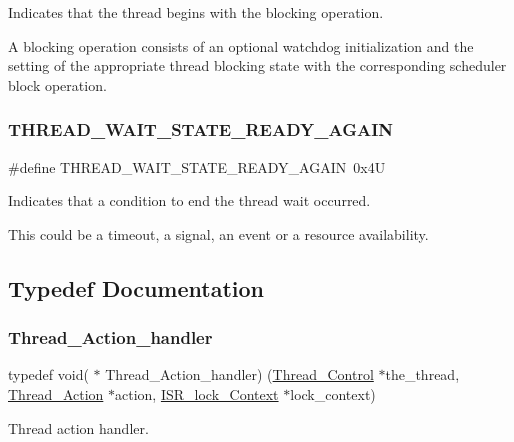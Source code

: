 Indicates that the thread begins with the blocking operation. 

A blocking operation consists of an optional watchdog initialization and the setting of the appropriate thread blocking state with the corresponding scheduler block operation. \mbox{\label{group__RTEMSScoreThread_gac00cb9ccdda63a4731f4d80a89371ea0}} 
\subsubsection{\texorpdfstring{THREAD\_WAIT\_STATE\_READY\_AGAIN}{THREAD\_WAIT\_STATE\_READY\_AGAIN}}
{\footnotesize\ttfamily \#define T\+H\+R\+E\+A\+D\+\_\+\+W\+A\+I\+T\+\_\+\+S\+T\+A\+T\+E\+\_\+\+R\+E\+A\+D\+Y\+\_\+\+A\+G\+A\+IN~0x4U}



Indicates that a condition to end the thread wait occurred. 

This could be a timeout, a signal, an event or a resource availability. 

\subsection{Typedef Documentation}
\mbox{\label{group__RTEMSScoreThread_ga3ed91c6271fd8090120d824662541c74}} 
\subsubsection{\texorpdfstring{Thread\_Action\_handler}{Thread\_Action\_handler}}
{\footnotesize\ttfamily typedef void( $\ast$ Thread\+\_\+\+Action\+\_\+handler) (\mbox{\hyperlink{struct__Thread__Control}{Thread\+\_\+\+Control}} $\ast$the\+\_\+thread, \mbox{\hyperlink{structThread__Action}{Thread\+\_\+\+Action}} $\ast$action, \mbox{\hyperlink{structISR__lock__Context}{I\+S\+R\+\_\+lock\+\_\+\+Context}} $\ast$lock\+\_\+context)}



Thread action handler. 

